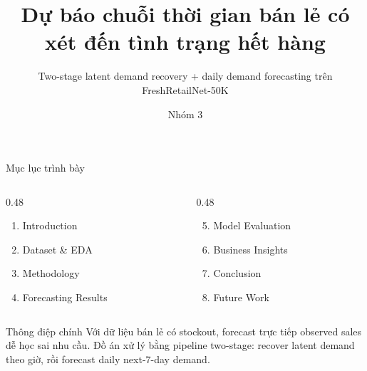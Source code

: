 \documentclass[aspectratio=169,10pt]{beamer}
\title[FreshRetailNet-50K]{Dự báo chuỗi thời gian bán lẻ có xét đến tình trạng hết hàng}
\subtitle{Two-stage latent demand recovery + daily demand forecasting trên FreshRetailNet-50K}
\author{Nhóm 3}
\date{}
\begin{document}
\begin{frame}
    \titlepage
\end{frame}

\begin{frame}{Mục lục trình bày}
    \begin{columns}[T]
        \begin{column}{0.48\linewidth}
            \begin{enumerate}
                \item Introduction
                \item Dataset \& EDA
                \item Methodology
                \item Forecasting Results
            \end{enumerate}
        \end{column}
        \begin{column}{0.48\linewidth}
            \begin{enumerate}
                \setcounter{enumi}{4}
                \item Model Evaluation
                \item Business Insights
                \item Conclusion
                \item Future Work
            \end{enumerate}
        \end{column}
    \end{columns}
    \vspace{0.25cm}
    \begin{block}{Thông điệp chính}
    Với dữ liệu bán lẻ có stockout, forecast trực tiếp observed sales dễ học sai nhu cầu. Đồ án xử lý bằng pipeline two-stage: recover latent demand theo giờ, rồi forecast daily next-7-day demand.
    \end{block}
\end{frame}
\end{document}

